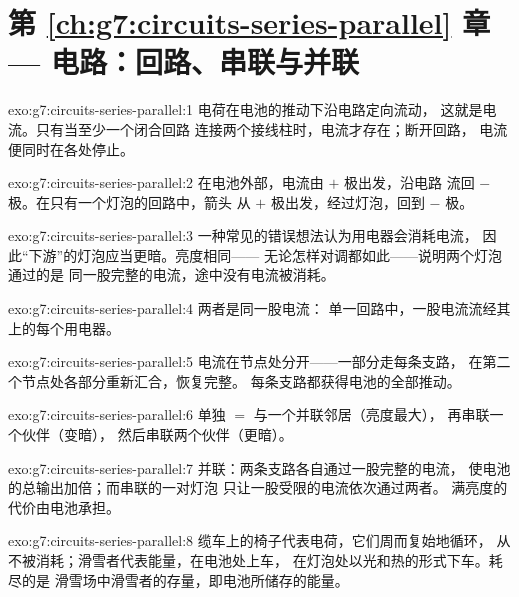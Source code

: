 \section*{第 \ref{ch:g7:circuits-series-parallel} 章 --- 电路：回路、串联与并联}

\begin{solution}{exo:g7:circuits-series-parallel:1}
电荷在电池的推动下沿电路定向流动，
这就是电流。只有当至少一个闭合回路
连接两个接线柱时，电流才存在；断开回路，
电流便同时在各处停止。
\end{solution}

\begin{solution}{exo:g7:circuits-series-parallel:2}
在电池外部，电流由 $+$ 极出发，沿电路
流回 $-$ 极。在只有一个灯泡的回路中，箭头
从 $+$ 极出发，经过灯泡，回到 $-$ 极。
\end{solution}

\begin{solution}{exo:g7:circuits-series-parallel:3}
一种常见的错误想法认为用电器会消耗电流，
因此“下游”的灯泡应当更暗。亮度相同——
无论怎样对调都如此——说明两个灯泡通过的是
同一股完整的电流，途中没有电流被消耗。
\end{solution}

\begin{solution}{exo:g7:circuits-series-parallel:4}
两者是同一股电流：
单一回路中，一股电流流经其上的每个用电器。
\end{solution}

\begin{solution}{exo:g7:circuits-series-parallel:5}
电流在节点处分开——一部分走每条支路，
在第二个节点处各部分重新汇合，恢复完整。
每条支路都获得电池的全部推动。
\end{solution}

\begin{solution}{exo:g7:circuits-series-parallel:6}
单独 $=$ 与一个并联邻居（亮度最大），
再串联一个伙伴（变暗），
然后串联两个伙伴（更暗）。
\end{solution}

\begin{solution}{exo:g7:circuits-series-parallel:7}
并联：两条支路各自通过一股完整的电流，
使电池的总输出加倍；而串联的一对灯泡
只让一股受限的电流依次通过两者。
满亮度的代价由电池承担。
\end{solution}

\begin{solution}{exo:g7:circuits-series-parallel:8}
缆车上的椅子代表电荷，它们周而复始地循环，
从不被消耗；滑雪者代表能量，在电池处上车，
在灯泡处以光和热的形式下车。耗尽的是
滑雪场中滑雪者的存量，即电池所储存的能量。
\end{solution}

